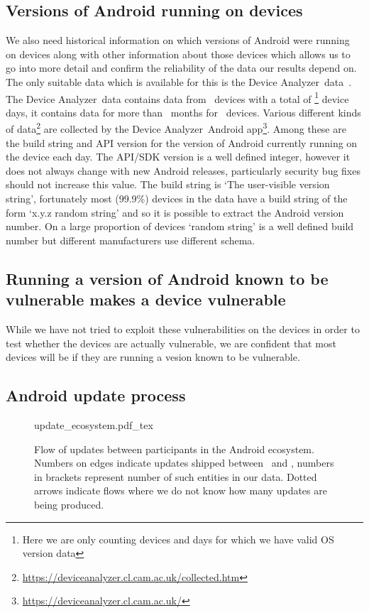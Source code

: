 \documentclass[conference,a4paper,twoside]{IEEEtran}
\let\OldTodo\todo
\renewcommand{\todo}{\OldTodo[inline]}
\newcommand{\da}{Device Analyzer}
\newcommand{\daNumDevices}{\daNumOSDevices}
\newcommand{\daDeviceDays}{\daOSTotalDaysData}
\begin{document}
\subsection{Versions of Android running on devices}
We also need historical information on which versions of Android were running on devices along with other information about those devices which allows us to go into more detail and confirm the reliability of the data our results depend on.
The only suitable data which is available for this is the \da\ data~\cite{Wagner2013}.
The \da\ data contains data from \daNumDevices\ devices with a total of \daDeviceDays\footnote{Here we are only counting devices and days for which we have valid OS version data} device days, it contains data for more than \daMonths\ months for \daMonthsDevices\ devices.
\todo{ talk about the \da\ project a bit}
Various different kinds of data\footnote{\url{https://deviceanalyzer.cl.cam.ac.uk/collected.htm}} are collected by the \da\ Android app\footnote{\url{https://deviceanalyzer.cl.cam.ac.uk/}}.
Among these are the build string and API version for the version of Android currently running on the device each day.
The API/SDK version is a well defined integer, however it does not always change with new Android releases, particularly security bug fixes should not increase this value.
The build string is `The user-visible version string', fortunately most (99.9\%) devices in the data have a build string of the form `x.y.z random string' and so it is possible to extract the Android version number.
On a large proportion of devices `random string' is a well defined build number but different manufacturers use different schema.

\subsection{Running a version of Android known to be vulnerable makes a device vulnerable}
While we have not tried to exploit these vulnerabilities on the devices in order to test whether the devices are actually vulnerable, we are confident that most devices will be if they are running a vesion known to be vulnerable. \todo{WHY?}

\subsection{Android update process}
\label{sec:android_update_process}
\begin{figure}
 \centering
 \def\svgwidth{\columnwidth}
 {update_ecosystem.pdf_tex}
 \caption{Flow of updates between participants in the Android ecosystem.
 Numbers on edges indicate updates shipped between \daStartDate\ and \daEndDate, numbers in brackets represent number of such entities in our data.
 Dotted arrows indicate flows where we do not know how many updates are being produced.}
 \label{fig:update_ecosystem}
\end{figure}
\end{document}
